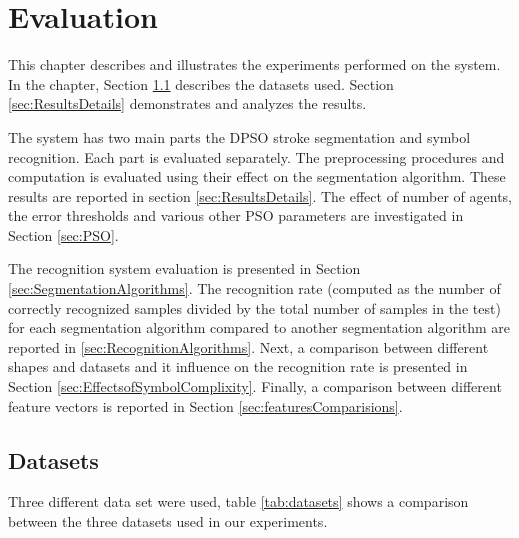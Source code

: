 
\chapter{Evaluation}
\label{sec:Evaluation}
This chapter describes and illustrates the experiments performed on the system. In the chapter, Section \ref{sec:Datasets} describes the datasets used. Section \ref{sec:ResultsDetails} demonstrates and analyzes the results. 

The system has two main parts the DPSO stroke segmentation and symbol recognition. Each part is evaluated separately. The preprocessing procedures and computation is evaluated using their effect on the segmentation algorithm. These results are reported in section \ref{sec:ResultsDetails}. The effect of number of agents, the error thresholds and various other PSO parameters are investigated in Section \ref{sec:PSO}. %

The recognition system evaluation is presented in Section \ref{sec:SegmentationAlgorithms}. The recognition rate (computed as the number of correctly recognized samples divided by the total number of samples in the test) for each segmentation algorithm compared to another segmentation algorithm are reported in \ref{sec:RecognitionAlgorithms}. Next, a comparison between different shapes and datasets and it influence on the recognition rate is presented in Section \ref{sec:EffectsofSymbolComplixity}. Finally, a comparison between different feature vectors is reported in Section \ref{sec:featuresComparisions}.

\section{Datasets}
\label{sec:Datasets}
Three different data set were used, table \ref{tab:datasets} shows a comparison between the three datasets used in our experiments. 

